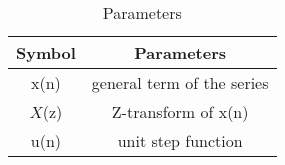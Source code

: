 

\begin{table}[h]
  \centering
  \begin{tabular}{|c|c|}
    \hline
    	\textbf{Symbol} & \textbf{Parameters} \\
    \hline
	  x(n) & general term of the series \\
    \hline
	  $X$(z) & Z-transform of x(n) \\
    \hline 
	  u(n) & unit step function \\
    \hline
  \end{tabular}
  \vspace{0.3cm}
  \caption{Parameters}
  \label{tab:parameters}
\end{table}
